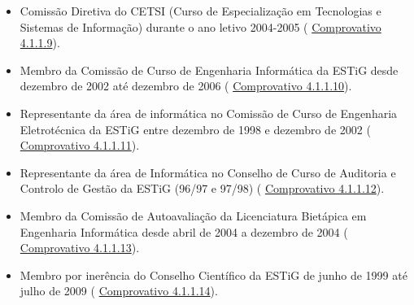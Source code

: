 \documentclass[11pt]{article}
\begin{document}
\begin{itemize}
\item{Comissão Diretiva do CETSI (Curso de Especialização em Tecnologias e Sistemas de Informação) durante o ano letivo 2004-2005 (
\href{run:MissaoIPBCargos/avaliacaoReestruturacao.pdf}{Comprovativo 4.1.1.9}).}
\item{Membro da Comissão de Curso de Engenharia Informática da ESTiG desde dezembro de 2002 até dezembro de 2006 (
\href{run:MissaoIPBCargos/CP.pdf}{Comprovativo 4.1.1.10}).}
\item{Representante da área de informática no Comissão de Curso de Engenharia Eletrotécnica da ESTiG entre dezembro de 1998 e dezembro de 2002 (
\href{run:MissaoIPBCargos/CP.pdf}{Comprovativo 4.1.1.11}).}
\item{Representante da área de Informática no Conselho de Curso de Auditoria e Controlo de Gestão da ESTiG (96/97 e 97/98) (
\href{run:MissaoIPBCargos/InfACG.pdf}{Comprovativo 4.1.1.12}).}
\item{Membro da Comissão de Autoavaliação da Licenciatura Bietápica em Engenharia Informática desde abril de 2004 a dezembro de 2004 (
\href{run:MissaoIPBCargos/CALEI.pdf}{Comprovativo 4.1.1.13}).}
\item{Membro por inerência do Conselho Científico da ESTiG de junho de 1999 até julho de 2009 (
\href{run:MissaoIPBCargos/ConselhoCientifico.pdf}{Comprovativo 4.1.1.14}). }
\end{itemize}
\end{document}
